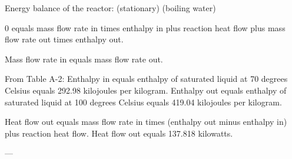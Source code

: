 Energy balance of the reactor: (stationary) (boiling water)  

0 equals mass flow rate in times enthalpy in plus reaction heat flow plus mass flow rate out times enthalpy out.  

Mass flow rate in equals mass flow rate out.  

From Table A-2:  
Enthalpy in equals enthalpy of saturated liquid at 70 degrees Celsius equals 292.98 kilojoules per kilogram.  
Enthalpy out equals enthalpy of saturated liquid at 100 degrees Celsius equals 419.04 kilojoules per kilogram.  

Heat flow out equals mass flow rate in times (enthalpy out minus enthalpy in) plus reaction heat flow.  
Heat flow out equals 137.818 kilowatts.  

---